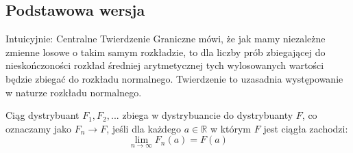 \subsection{Podstawowa wersja}
Intuicyjnie: Centralne Twierdzenie Graniczne mówi, że jak mamy niezależne zmienne losowe o takim samym rozkładzie, to dla liczby prób zbiegającej do nieskończoności rozkład średniej arytmetycznej tych wylosowanych wartości będzie zbiegać do rozkładu normalnego.
Twierdzenie to uzasadnia występowanie w naturze rozkładu normalnego.
\begin{definition}
	Ciąg dystrybuant \( F_1, F_2, ... \) zbiega w dystrybuancie do dystrybuanty \( F\), co oznaczamy jako \(F_n \to F \), jeśli dla każdego \(a \in \mathbb{R} \) w którym \( F \) jest ciągła zachodzi:
	\[
		\lim_{n \to \infty} F_n(a) = F(a)
	\]
\end{definition}

